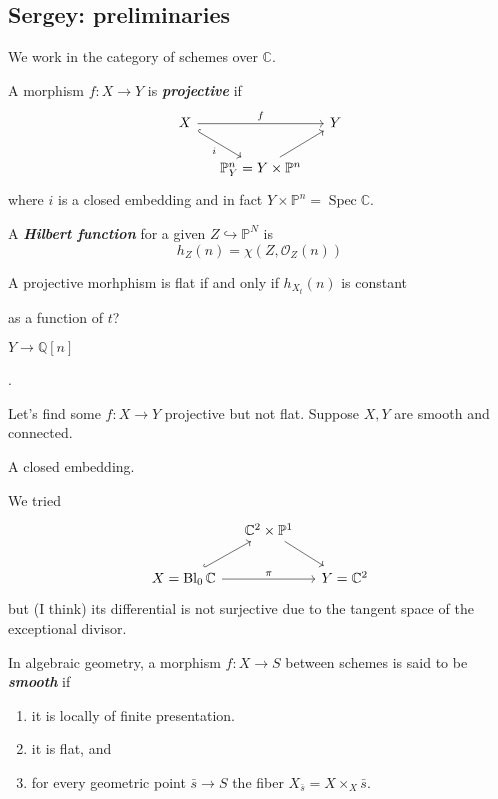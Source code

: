 \documentclass{article}
\numberwithin{equation}{section}
\newcommand{\C}{\mathbb{C}}
\newcommand{\Q}{\mathbb{Q}}
\renewcommand{\P}{\mathbb{P}}
\newcommand{\Oc}{\mathcal{O}}
\DeclareMathOperator{\Bl}{Bl}
\DeclareMathOperator{\Spec}{Spec}
\begin{document}
\subsection{Sergey: preliminaries}
We work in the category of schemes over $\C$.
\begin{defn}
	A morphism $f:X\to Y$ is \textbf{\textit{projective}} if
	\[\begin{tikzcd}[column sep=small]
		X\arrow[rr,"f"]\arrow[dr,hook,"i",swap]&&Y\\
		&\P^n_Y=Y\times\P^n\arrow[ur]
	\end{tikzcd}\]
	where $i$ is a closed embedding and in fact $Y\times\P^n=\Spec\C$.
\end{defn}
\begin{defn}
	A \textbf{\textit{Hilbert function}} for a given $Z\hookrightarrow\P^N$ is
	\[h_Z(n)=\chi(Z,\Oc_Z(n))\]
\end{defn}
\begin{claim}
	A projective morhphism is flat if and only if $h_{X_t}(n)$ is constant {\color{azure}as a function of $t$?
		
	$Y\to\Q[n]$}.
\end{claim}
\begin{example}
	Let's find some $f:X\to Y$ projective but not flat. Suppose $X,Y$ are smooth and connected.
	
	A closed embedding.
		
		We tried
		\[\begin{tikzcd}[column sep=small]
			&\C^2\times\P^1\arrow[dr]\\
			X=\Bl_0\C\arrow[ur,hook]\arrow[rr,"\pi"]&&Y=\C^2
		\end{tikzcd}\]
		but {\color{azure}(I think)} its differential is not surjective due to the tangent space of the exceptional divisor.
		
\begin{defn}
	In algebraic geometry, a morphism $f:X\to S$ between schemes is said to be \textbf{\textit{smooth}} if
	\begin{enumerate}
		\item it is locally of finite presentation.
		\item it is flat, and
		\item for every geometric point $\bar{s}\to S$ the fiber $X_{\bar{s}}=X\times_X\bar{s}$.
	\end{enumerate}
\end{defn}
	
	
	
\end{example}
\end{document}
